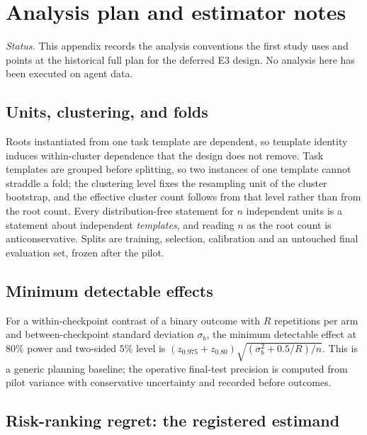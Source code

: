 \section{Analysis plan and estimator notes}
\label{app:b-analysis}

\emph{Status.} This appendix records the analysis conventions the first study
uses and points at the historical full plan for the deferred E3 design.  No
analysis here has been executed on agent data.

\subsection{Units, clustering, and folds}

Roots instantiated from one task template are dependent, so template identity
induces within-cluster dependence that the design does not remove.  Task
templates are grouped before splitting, so two instances of one template cannot
straddle a fold; the clustering level fixes the resampling unit of the cluster
bootstrap, and the effective cluster count follows from that level rather than
from the root count.  Every distribution-free statement for $n$ independent
units is a statement about independent \emph{templates}, and reading $n$ as the
root count is anticonservative.  Splits are training, selection, calibration and
an untouched final evaluation set, frozen after the pilot.

\subsection{Minimum detectable effects}

For a within-checkpoint contrast of a binary outcome with $R$ repetitions per
arm and between-checkpoint standard deviation $\sigma_b$, the minimum detectable
effect at $80\%$ power and two-sided $5\%$ level is
$(z_{0.975}+z_{0.80})\sqrt{(\sigma_b^2+0.5/R)/n}$.  This is a generic planning
baseline; the operative final-test precision is computed from pilot variance
with conservative uncertainty and recorded before outcomes.

\subsection{Risk-ranking regret: the registered estimand}
\label{app:e3-estimator}


